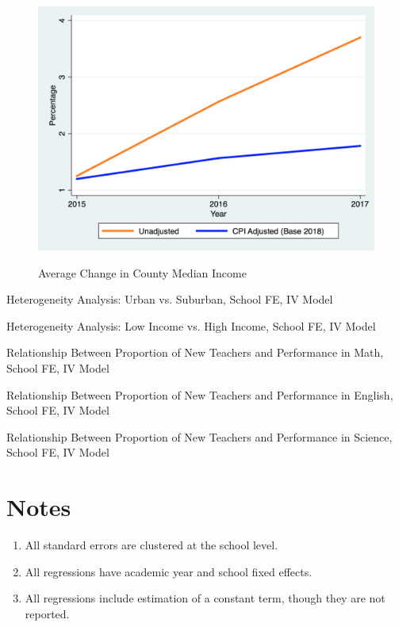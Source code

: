 \documentclass[12pt]{report}
\begin{document}
\begin{figure}[!htb]
    \centering
    \caption{Average Change in County Median Income}
    \includegraphics[frame, scale=0.25]{med_inc_story.png}
    \label{fig:my_label}
\end{figure}

\clearpage
\begin{table}[!htb]
\caption{Heterogeneity Analysis: Urban vs. Suburban, School FE, IV Model}
    \centering

\end{table}
\clearpage
\begin{table}[!htb]
\caption{Heterogeneity Analysis: Low Income vs. High Income, School FE, IV Model}
    \centering

\end{table}
\clearpage
\begin{table}[!htb]
\caption{Relationship Between Proportion of New Teachers and Performance in Math, School FE, IV Model}
    \centering

\end{table}
\clearpage
\begin{table}[!htb]
\caption{Relationship Between Proportion of New Teachers and Performance in English, School FE, IV Model}
    \centering

\end{table}
\clearpage
\begin{table}[!htb]
\caption{Relationship Between Proportion of New Teachers and Performance in Science, School FE, IV Model}
    \centering

\end{table}
\clearpage
\clearpage
\section{Notes}
\begin{enumerate}
    \item All standard errors are clustered at the school level.
    \item All regressions have academic year and school fixed effects.
    \item All regressions include estimation of a constant term, though they are not reported.
\end{enumerate}



\nocite{acs}

\normalsize
\newpage
\nocite{pde}
\begingroup
    \setlength{\bibsep}{10pt}
    
    
\endgroup
\end{document}
